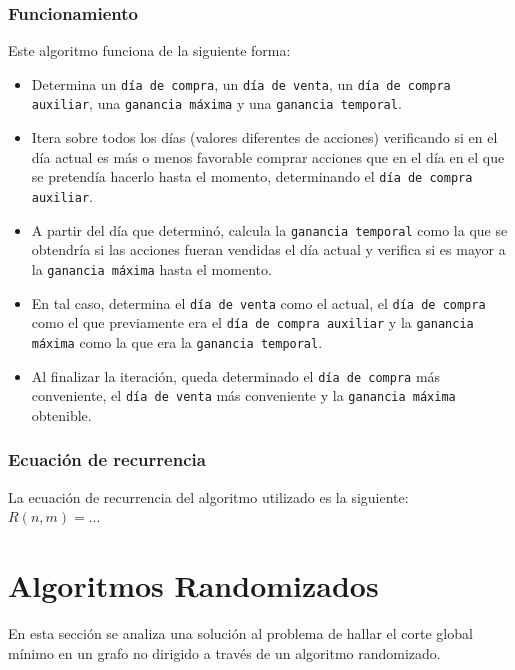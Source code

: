 \documentclass[a4paper, 10pt]{article}
\def\code#1{\texttt{#1}}
\newcommand\tab[1][0.5cm]{\hspace*{#1}}
\begin{document}
            \subsubsection{Funcionamiento}
                \tab Este algoritmo funciona de la siguiente forma:
                \begin{itemize}
                    \item Determina un \code{día de compra}, un \code{día de venta}, un \code{día de compra auxiliar},
                    una \code{ganancia máxima} y una \code{ganancia temporal}.
                    \item Itera sobre todos los días (valores diferentes de acciones) verificando si
                    en el día actual es más o menos favorable comprar acciones que en el día en el
                    que se pretendía hacerlo hasta el momento, determinando el \code{día de compra auxiliar}.
                    \item A partir del día que determinó, calcula la \code{ganancia temporal} como la que se obtendría
                    si las acciones fueran vendidas el día actual y verifica si es mayor a la \code{ganancia máxima}
                    hasta el momento.
                    \item En tal caso, determina el \code{día de venta} como el actual, el \code{día de compra}
                    como el que previamente era el \code{día de compra auxiliar} y la \code{ganancia máxima} como
                    la que era la \code{ganancia temporal}.
                    \item Al finalizar la iteración, queda determinado el \code{día de compra} más conveniente, el
                    \code{día de venta} más conveniente y la \code{ganancia máxima} obtenible.
                \end{itemize}
            \subsubsection{Ecuación de recurrencia}
                \tab La ecuación de recurrencia del algoritmo utilizado es la siguiente: \\
                \tab\tab\tab $ R(n, m) = ... $ %
    \newpage

    \section{Algoritmos Randomizados}
        \tab En esta sección se analiza una solución al problema de hallar el corte global
        mínimo en un grafo no dirigido a través de un algoritmo randomizado.
\end{document}
